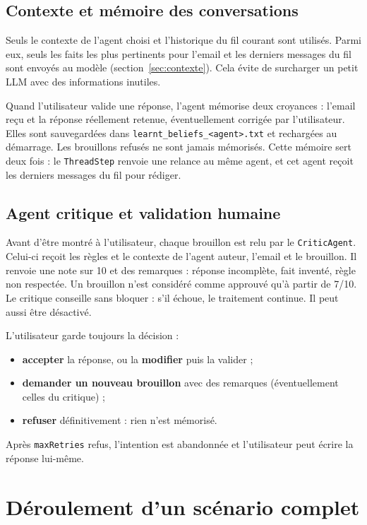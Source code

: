 \documentclass[11pt,a4paper]{article}
\newcommand{\code}[1]{\texttt{#1}}
\begin{document}
\subsection{Contexte et mémoire des conversations}

Seuls le contexte de l'agent choisi et l'historique du fil courant sont utilisés.
Parmi eux, seuls les faits les plus pertinents pour l'email et les derniers messages du
fil sont envoyés au modèle (section~\ref{sec:contexte}). Cela évite de surcharger un
petit LLM avec des informations inutiles.

Quand l'utilisateur valide une réponse, l'agent mémorise deux croyances : l'email reçu et
la réponse réellement retenue, éventuellement corrigée par l'utilisateur. Elles sont
sauvegardées dans \code{learnt\_beliefs\_<agent>.txt} et rechargées au démarrage. Les
brouillons refusés ne sont jamais mémorisés. Cette mémoire sert deux fois : le
\code{ThreadStep} renvoie une relance au même agent, et cet agent reçoit les derniers
messages du fil pour rédiger.

\subsection{Agent critique et validation humaine}

Avant d'être montré à l'utilisateur, chaque brouillon est relu par le \code{CriticAgent}.
Celui-ci reçoit les règles et le contexte de l'agent auteur, l'email et le brouillon. Il
renvoie une note sur 10 et des remarques : réponse incomplète, fait inventé, règle non
respectée. Un brouillon n'est considéré comme approuvé qu'à partir de 7/10. Le critique
conseille sans bloquer : s'il échoue, le traitement continue. Il peut aussi être désactivé.

L'utilisateur garde toujours la décision :
\begin{itemize}
  \item \textbf{accepter} la réponse, ou la \textbf{modifier} puis la valider ;
  \item \textbf{demander un nouveau brouillon} avec des remarques (éventuellement celles du critique) ;
  \item \textbf{refuser} définitivement : rien n'est mémorisé.
\end{itemize}
Après \code{maxRetries} refus, l'intention est abandonnée et l'utilisateur peut écrire la
réponse lui-même.

\section{Déroulement d'un scénario complet}
\end{document}
